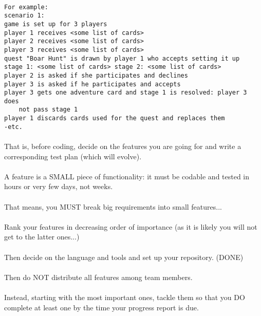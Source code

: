 \documentclass[a4paper,11pt]{article}
\begin{document}
\paragraph{}

\begin{lstlisting}
For example:
scenario 1:
game is set up for 3 players
player 1 receives <some list of cards>
player 2 receives <some list of cards>
player 3 receives <some list of cards>
quest "Boar Hunt" is drawn by player 1 who accepts setting it up
stage 1: <some list of cards> stage 2: <some list of cards>
player 2 is asked if she participates and declines
player 3 is asked if he participates and accepts
player 3 gets one adventure card and stage 1 is resolved: player 3 does 
	not pass stage 1
player 1 discards cards used for the quest and replaces them
-etc.	
\end{lstlisting}

\paragraph{}
That is, before coding, decide on the features you are going for and write a corresponding test plan (which will evolve).
\paragraph{}
A feature is a SMALL piece of functionality: it must be codable and tested in hours or very few days, not weeks.
\paragraph{}
That means, you MUST break big requirements into small features...
\paragraph{}
Rank your features in decreasing order of importance (as it is likely you will not get to the latter ones...)
\paragraph{}
Then decide on the language and tools and set up your repository. (DONE)
\paragraph{}
Then do NOT distribute all features among team members.
\paragraph{}
Instead, starting with the most important ones, tackle them so that you DO complete at least one by the time your progress report is due.
\end{document}
